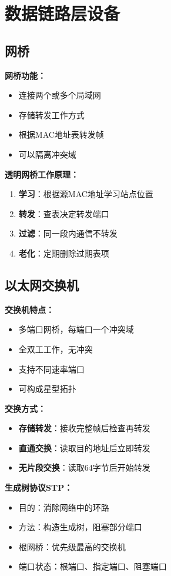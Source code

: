 \documentclass[lang=cn,newtx,10pt,scheme=chinese]{../../elegantbook}
\begin{document}
\section{数据链路层设备}

\subsection{网桥}

\textbf{网桥功能：}
\begin{itemize}
  \item 连接两个或多个局域网
  \item 存储转发工作方式
  \item 根据MAC地址表转发帧
  \item 可以隔离冲突域
\end{itemize}

\textbf{透明网桥工作原理：}
\begin{enumerate}
  \item \textbf{学习}：根据源MAC地址学习站点位置
  \item \textbf{转发}：查表决定转发端口
  \item \textbf{过滤}：同一段内通信不转发
  \item \textbf{老化}：定期删除过期表项
\end{enumerate}


\subsection{以太网交换机}

\textbf{交换机特点：}
\begin{itemize}
  \item 多端口网桥，每端口一个冲突域
  \item 全双工工作，无冲突
  \item 支持不同速率端口
  \item 可构成星型拓扑
\end{itemize}

\textbf{交换方式：}
\begin{itemize}
  \item \textbf{存储转发}：接收完整帧后检查再转发
  \item \textbf{直通交换}：读取目的地址后立即转发
  \item \textbf{无片段交换}：读取64字节后开始转发
\end{itemize}

\textbf{生成树协议STP：}
\begin{itemize}
  \item 目的：消除网络中的环路
  \item 方法：构造生成树，阻塞部分端口
  \item 根网桥：优先级最高的交换机
  \item 端口状态：根端口、指定端口、阻塞端口
\end{itemize}
\end{document}
